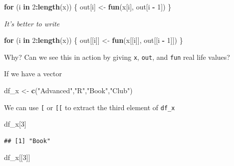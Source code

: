 \documentclass[]{book}
\newenvironment{Shaded}{\begin{snugshade}}{\end{snugshade}}
\newcommand{\ControlFlowTok}[1]{\textcolor[rgb]{0.13,0.29,0.53}{\textbf{#1}}}
\newcommand{\DecValTok}[1]{\textcolor[rgb]{0.00,0.00,0.81}{#1}}
\newcommand{\KeywordTok}[1]{\textcolor[rgb]{0.13,0.29,0.53}{\textbf{#1}}}
\newcommand{\NormalTok}[1]{#1}
\newcommand{\OperatorTok}[1]{\textcolor[rgb]{0.81,0.36,0.00}{\textbf{#1}}}
\newcommand{\StringTok}[1]{\textcolor[rgb]{0.31,0.60,0.02}{#1}}
\begin{document}
\begin{Shaded}
\begin{Highlighting}[]
\ControlFlowTok{for}\NormalTok{ (i }\ControlFlowTok{in} \DecValTok{2}\OperatorTok{:}\KeywordTok{length}\NormalTok{(x)) \{}
\NormalTok{  out[i] <-}\StringTok{ }\KeywordTok{fun}\NormalTok{(x[i], out[i }\OperatorTok{-}\StringTok{ }\DecValTok{1}\NormalTok{])}
\NormalTok{\}}
\end{Highlighting}
\end{Shaded}

\emph{It's better to write}

\begin{Shaded}
\begin{Highlighting}[]
\ControlFlowTok{for}\NormalTok{ (i }\ControlFlowTok{in} \DecValTok{2}\OperatorTok{:}\KeywordTok{length}\NormalTok{(x)) \{}
\NormalTok{  out[[i]] <-}\StringTok{ }\KeywordTok{fun}\NormalTok{(x[[i]], out[[i }\OperatorTok{-}\StringTok{ }\DecValTok{1}\NormalTok{]])}
\NormalTok{\}}
\end{Highlighting}
\end{Shaded}

Why? Can we see this in action by giving \texttt{x}, \texttt{out}, and \texttt{fun} real life values?

If we have a vector

\begin{Shaded}
\begin{Highlighting}[]
\NormalTok{df_x <-}\StringTok{ }\KeywordTok{c}\NormalTok{(}\StringTok{"Advanced"}\NormalTok{,}\StringTok{"R"}\NormalTok{,}\StringTok{"Book"}\NormalTok{,}\StringTok{"Club"}\NormalTok{)}
\end{Highlighting}
\end{Shaded}

We can use \texttt{{[}} or \texttt{{[}{[}} to extract the third element of \texttt{df\_x}

\begin{Shaded}
\begin{Highlighting}[]
\NormalTok{df_x[}\DecValTok{3}\NormalTok{]}
\end{Highlighting}
\end{Shaded}

\begin{verbatim}
## [1] "Book"
\end{verbatim}

\begin{Shaded}
\begin{Highlighting}[]
\NormalTok{df_x[[}\DecValTok{3}\NormalTok{]]}
\end{Highlighting}
\end{Shaded}
\end{document}
